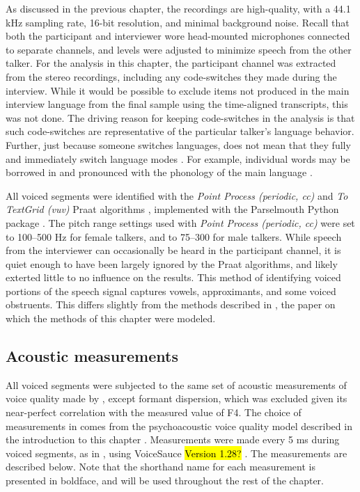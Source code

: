 As discussed in the previous chapter, the recordings are high-quality, with a 44.1 kHz sampling rate, 16-bit resolution, and minimal background noise. Recall that both the participant and interviewer wore head-mounted microphones connected to separate channels, and levels were adjusted to minimize speech from the other talker. For the analysis in this chapter, the participant channel was extracted from the stereo recordings, including any code-switches they made during the interview. While it would be possible to exclude items not produced in the main interview language from the final sample using the time-aligned transcripts, this was not done. The driving reason for keeping code-switches in the analysis is that such code-switches are representative of the particular talker's language behavior. Further, just because someone switches languages, does not mean that they fully and immediately switch language modes \citep[e.g.,][]{fricke_2016_phonetic}. For example, individual words may be borrowed in and pronounced with the phonology of the main language \citep[i.e., the matrix language in code-switching][]{myersscotton_2011_matrix}. 

All voiced segments were identified with the \textit{Point Process (periodic, cc)} and \textit{To TextGrid (vuv)} Praat algorithms \citep{boersma_2021_praat}, implemented with the Parselmouth Python package \citep{jadoul_2018_parselmouth}. The pitch range settings used with \textit{Point Process (periodic, cc)} were set to 100--500 Hz for female talkers, and to 75--300 for male talkers. While speech from the interviewer can occasionally be heard in the participant channel, it is quiet enough to have been largely ignored by the Praat algorithms, and likely exterted little to no influence on the results. This method of identifying voiced portions of the speech signal captures vowels, approximants, and some voiced obstruents. This differs slightly from the methods described in \citet{lee_2019_acoustic}, the paper on which the methods of this chapter were modeled. 

\subsection{Acoustic measurements}\label{ch3:sec:acoustic}
All voiced segments were subjected to the same set of acoustic measurements of voice quality made by \citet{lee_2019_acoustic}, except formant dispersion, which was excluded given its near-perfect correlation with the measured value of F4. The choice of measurements in \citet{lee_2019_acoustic} comes from the psychoacoustic voice quality model described in the introduction to this chapter \citep{kreiman_2014_theory}. Measurements were made every 5 ms during voiced segments, as in \citet{lee_2019_acoustic}, using VoiceSauce \hl{Version 1.28?} \citep{shue_2011_voicesauce}. The measurements are described below. Note that the shorthand name for each measurement is presented in boldface, and will be used throughout the rest of the chapter. 


